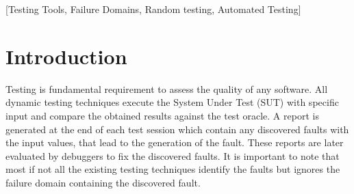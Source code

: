 \documentclass{acm_proc_article-sp}
\begin{document}
\maketitle
\begin{abstract}
Many research studies in the random testing literature refer to 
point, block and strip fault domains across the input domain of a system.
A number of new strategies have also been devised on this principle claiming better results.
However, no study was conducted to graphically show their existence
and the frequency of each faulty domain in real production application. 

In this research we study fault domains and check to which type of domains they belong. 
Our experimental results show that in 60\%  cases faults form point domain, 
while block and strip domain form 20\% each. We also checked what relation exists 
between fault domains traced back to only one fault: are they contiguous, separate, or marginally adherent. 

This study allows for a better understanding of fault domains and assumptions made on the 
strategies for testing code. We applied our results by correlating our study with three random strategies: random, random+ and DSSR. 

\end{abstract}

[Testing Tools, Failure Domains, Random testing, Automated Testing]

\section{Introduction}

Testing is fundamental requirement to assess the quality of any software.
All dynamic testing techniques execute the System Under Test (SUT) with specific input 
and compare the obtained results against the test oracle. A report is generated at the end of each test session which contain any 
discovered faults with the input values, that lead to the generation of the fault. These reports are later evaluated by
debuggers to fix the discovered faults. It is important to note that most if not all the existing testing 
techniques identify the faults but ignores the failure domain containing the discovered fault.\\

\end{document}
